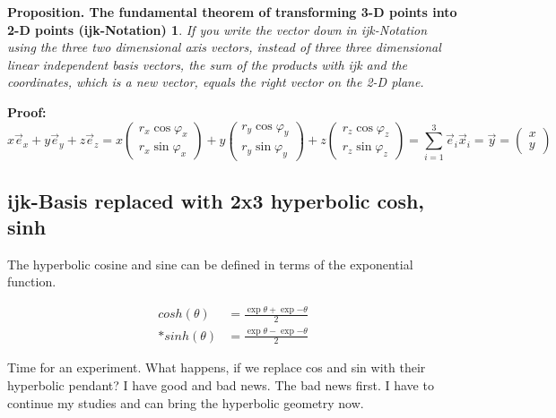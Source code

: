 \documentclass[a4paper]{article}
\begin{document}
\newtheorem{ijkVersion}{Proposition. The fundamental theorem of transforming 3-D points into 2-D points (ijk-Notation)}
\begin{ijkVersion}
If you write the vector down in ijk-Notation using the three two dimensional axis vectors, instead of three three dimensional linear independent basis vectors, the sum of the products with ijk and the coordinates, which is a new vector, equals the right vector on the 2-D plane.
\end{ijkVersion}

\textbf{Proof:}\\
\begin{displaymath}
 x\vec{e}_{x}+y\vec{e}_{y}+z\vec{e}_{z} = x\begin{pmatrix}r_x\cos\varphi_x\\r_x\sin\varphi_x\end{pmatrix} + y\begin{pmatrix}r_y\cos\varphi_y\\r_y\sin\varphi_y\end{pmatrix} + z\begin{pmatrix}r_z\cos\varphi_z\\r_z\sin\varphi_z\end{pmatrix} = \sum_{i=1}^{3}\vec{e}_{i}\vec{x}_{i} = \vec{y} = \begin{pmatrix}x\\y\end{pmatrix}
\end{displaymath}


\subsection{ijk-Basis replaced with 2x3 hyperbolic cosh, sinh}

The hyperbolic cosine and sine can be defined in terms of the exponential function.

\begin{displaymath}
\begin{align}
	cosh(\theta) &= \frac{\exp{\theta} + \exp{-\theta}}{2}\\
	*
	sinh(\theta) &= \frac{\exp{\theta} - \exp{-\theta}}{2}
\end{align}
\end{displaymath}


Time for an experiment. What happens, if we replace cos and sin with their hyperbolic pendant? I have good and bad news. The bad news first. I have to continue my studies and can bring the hyperbolic geometry now.
\end{document}
